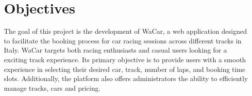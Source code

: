 \section{Objectives}

The goal of this project is the development of WaCar, a web application designed to facilitate the booking process for car racing sessions across different tracks in Italy.
WaCar targets both racing enthusiasts and casual users looking for a exciting track experience.
Its primary objective is to provide users with a smooth experience in selecting their desired car, track, number of laps, and booking time slots.
Additionally, the platform also offers administrators the ability to efficiently manage tracks, cars and pricing.